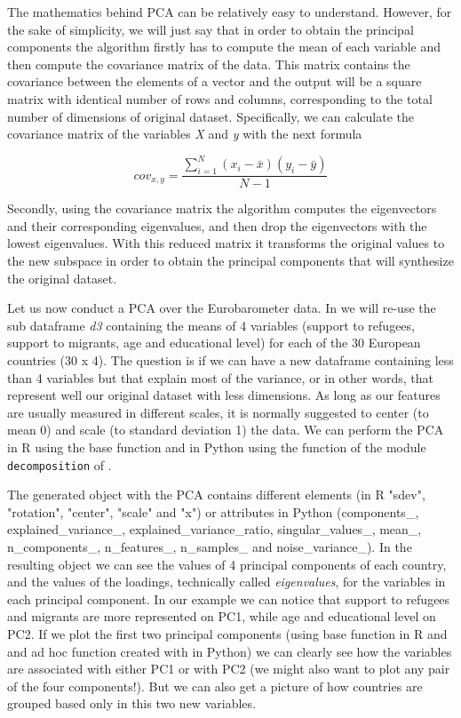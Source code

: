 The mathematics behind PCA can be relatively easy to
understand. However, for the sake of simplicity, we will just say that
in order to obtain the principal components the algorithm firstly has
to compute the mean of each variable and then compute the covariance
matrix of the data. This matrix contains the covariance between the
elements of a vector and the output will be a square matrix with
identical number of rows and columns, corresponding to the total
number of dimensions of original dataset. Specifically, we can
calculate the covariance matrix of the variables \emph{X} and \emph{y}
with the next formula

$$cov_{x,y}=\frac{\sum_{i=1}^{N}(x_{i}-\bar{x})(y_{i}-\bar{y})}{N-1}$$

Secondly, using the covariance matrix the algorithm computes the eigenvectors and their corresponding eigenvalues, and then drop the eigenvectors with the lowest eigenvalues. With this reduced matrix it transforms the original values to the new subspace in order to obtain the principal components that will synthesize the original dataset.

Let us now conduct a PCA over the Eurobarometer data.  In  we will re-use the sub dataframe \emph{d3} containing the means of 4 variables (support to refugees, support to migrants, age and educational level) for each of the 30 European countries (30 x 4). The question is if we can have a new dataframe containing less than 4 variables but that explain most of the variance, or in other words, that represent well our original dataset with less dimensions. As long as our features are usually measured in different scales, it is normally suggested to center (to mean 0) and scale (to standard deviation 1) the data. We can perform the PCA in R using the base function  and in Python using the function  of the module \texttt{decomposition} of . 


The generated object with the PCA contains different elements (in R "sdev",     "rotation", "center",  "scale" and   "x") or attributes in Python (components\_, explained\_variance\_, explained\_variance\_ratio, singular\_values\_, mean\_, n\_components\_, n\_features\_, n\_samples\_ and noise\_variance\_). In the resulting object we can see the values of 4 principal components of each country, and the values of the loadings, technically called \textit{eigenvalues}, for the variables in each principal component. In our example we can notice that support to refugees and migrants are more represented on PC1, while age and educational level on PC2. If we plot the first two principal components (using base function  in R and and ad hoc function created with  in Python) we can clearly see how the variables are associated with either PC1 or with PC2 (we might also want to plot any pair of the four components!). But we can also get a picture of how countries are grouped based only in this two new variables.

